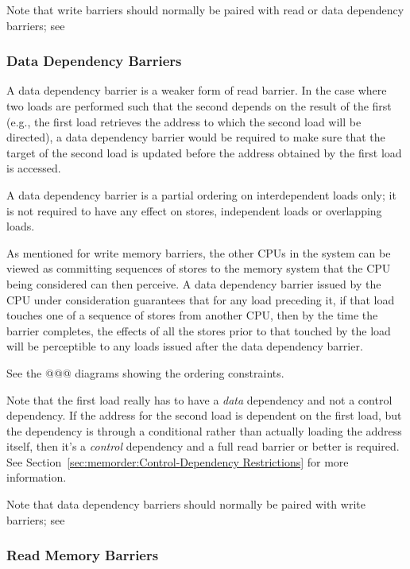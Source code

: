 Note that write barriers should normally be paired with read
or data dependency barriers; see

\subsubsection{Data Dependency Barriers}

A data dependency barrier is a weaker form of read barrier.  In the case
where two loads are performed such that the second depends on the result
of the first (e.g., the first load retrieves the address to which the second
load will be directed), a data dependency barrier would be required to
make sure that the target of the second load is updated before the address
obtained by the first load is accessed.

A data dependency barrier is a partial ordering on interdependent loads
only; it is not required to have any effect on stores, independent loads
or overlapping loads.

As mentioned for write memory barriers,
the other CPUs in the system can be viewed as
committing sequences of stores to the memory system that the CPU being
considered can then perceive.  A data dependency barrier issued by the CPU
under consideration guarantees that for any load preceding it, if that
load touches one of a sequence of stores from another CPU, then by the
time the barrier completes, the effects of all the stores prior to that
touched by the load will be perceptible to any loads issued after the data
dependency barrier.

See the @@@ %
diagrams showing the ordering constraints.

Note that the first load really has to have a
\emph{data} dependency and
not a control dependency.  If the address for the second load is dependent
on the first load, but the dependency is through a conditional rather than
actually loading the address itself, then it's a \emph{control} dependency and
a full read barrier or better is required.  See
Section~\ref{sec:memorder:Control-Dependency Restrictions} for more information.

Note that data dependency barriers should normally be paired with
write barriers; see %

\subsubsection{Read Memory Barriers}

